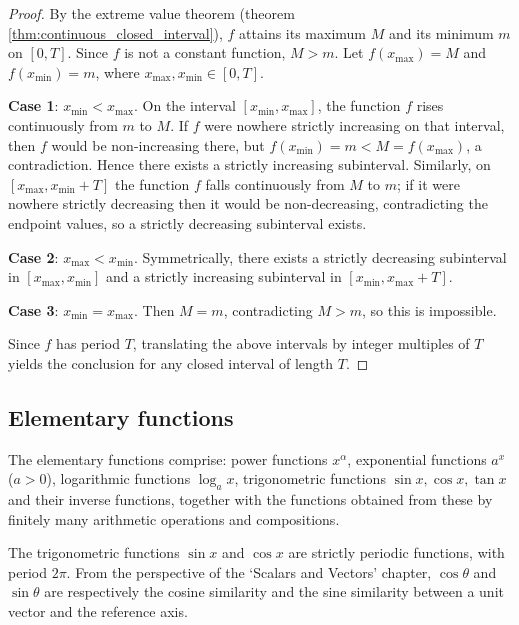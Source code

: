 \begin{proof}
By the extreme value theorem (theorem \ref{thm:continuous_closed_interval}), $f$ attains its maximum $M$ and its minimum $m$ on $[0,T]$. Since $f$ is not a constant function, $M > m$. Let $f(x_{\max}) = M$ and $f(x_{\min}) = m$, where $x_{\max}, x_{\min} \in [0,T]$.

\textbf{Case 1}: $x_{\min} < x_{\max}$. On the interval $[x_{\min}, x_{\max}]$, the function $f$ rises continuously from $m$ to $M$. If $f$ were nowhere strictly increasing on that interval, then $f$ would be non-increasing there, but $f(x_{\min}) = m < M = f(x_{\max})$, a contradiction. Hence there exists a strictly increasing subinterval. Similarly, on $[x_{\max}, x_{\min}+T]$ the function $f$ falls continuously from $M$ to $m$; if it were nowhere strictly decreasing then it would be non-decreasing, contradicting the endpoint values, so a strictly decreasing subinterval exists.

\textbf{Case 2}: $x_{\max} < x_{\min}$. Symmetrically, there exists a strictly decreasing subinterval in $[x_{\max}, x_{\min}]$ and a strictly increasing subinterval in $[x_{\min}, x_{\max}+T]$.

\textbf{Case 3}: $x_{\min} = x_{\max}$. Then $M = m$, contradicting $M > m$, so this is impossible.

Since $f$ has period $T$, translating the above intervals by integer multiples of $T$ yields the conclusion for any closed interval of length $T$.
\end{proof}

\subsection{\texorpdfstring{Elementary functions}{Elementary functions}}

\begin{definition}\label{def:elementary_functions}
The elementary functions comprise: power functions $x^\alpha$, exponential functions $a^x$ ($a>0$), logarithmic functions $\log_a x$, trigonometric functions $\sin x, \cos x, \tan x$ and their inverse functions, together with the functions obtained from these by finitely many arithmetic operations and compositions.
\end{definition}

\begin{remark}\label{rem:trig_similarity}
The trigonometric functions $\sin x$ and $\cos x$ are strictly periodic functions, with period $2\pi$. From the perspective of the `Scalars and Vectors' chapter, $\cos\theta$ and $\sin\theta$ are respectively the cosine similarity and the sine similarity between a unit vector and the reference axis.
\end{remark}

